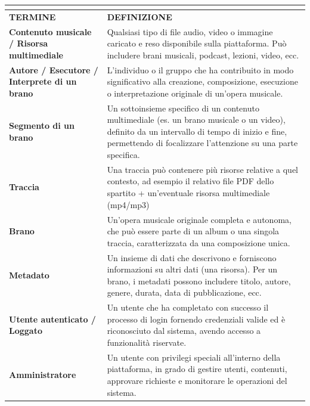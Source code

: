 \documentclass[a4paper]{article}
\begin{document}
\begin{table}[H]
    \centering
    \renewcommand{\arraystretch}{1.5}
    \begin{tabular}{|>{\bfseries}p{}|p{}|}
        \hline
        \multicolumn{2}{|c|}{\textbf{GLOSSARIO DEI TERMINI}} \\
        \hline
        \textbf{TERMINE} & \textbf{DEFINIZIONE} \\
        \hline
        Contenuto musicale / Risorsa multimediale & Qualsiasi tipo di file audio, video o immagine caricato e reso disponibile sulla piattaforma. Può includere brani musicali, podcast, lezioni, video, ecc. \\
        \hline
        Autore / Esecutore / Interprete di un brano & L'individuo o il gruppo che ha contribuito in modo significativo alla creazione, composizione, esecuzione o interpretazione originale di un'opera musicale. \\
        \hline
        Segmento di un brano & Un sottoinsieme specifico di un contenuto multimediale (es. un brano musicale o un video), definito da un intervallo di tempo di inizio e fine, permettendo di focalizzare l'attenzione su una parte specifica. \\
        \hline
        Traccia & Una traccia può contenere più risorse relative a quel contesto, ad esempio il relativo file PDF dello spartito + un'eventuale risorsa multimediale (mp4/mp3) \\
        \hline
        Brano & Un'opera musicale originale completa e autonoma, che può essere parte di un album o una singola traccia, caratterizzata da una composizione unica. \\
        \hline
        Metadato & Un insieme di dati che descrivono e forniscono informazioni su altri dati (una risorsa). Per un brano, i metadati possono includere titolo, autore, genere, durata, data di pubblicazione, ecc. \\
        \hline
        Utente autenticato / Loggato & Un utente che ha completato con successo il processo di login fornendo credenziali valide ed è riconosciuto dal sistema, avendo accesso a funzionalità riservate. \\
        \hline
        Amministratore & Un utente con privilegi speciali all'interno della piattaforma, in grado di gestire utenti, contenuti, approvare richieste e monitorare le operazioni del sistema. \\

\end{tabular}
\end{table}
\end{document}
